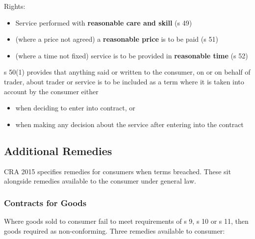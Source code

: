 \documentclass[
]{article}
\providecommand{\tightlist}{%
  \setlength{\itemsep}{0pt}\setlength{\parskip}{0pt}}
\begin{document}
Rights:

\begin{itemize}
\tightlist
\item
  Service performed with \textbf{reasonable care and skill} (s 49)
\item
  (where a price not agreed) a \textbf{reasonable price} is to be paid
  (s 51)
\item
  (where a time not fixed) service is to be provided in
  \textbf{reasonable time} (s 52)
\end{itemize}

s 50(1) provides that anything said or written to the consumer, on or on
behalf of trader, about trader or service is to be included as a term
where it is taken into account by the consumer either

\begin{itemize}
\tightlist
\item
  when deciding to enter into contract, or
\item
  when making any decision about the service after entering into the
  contract
\end{itemize}

\hypertarget{additional-remedies}{%
\subsection{Additional Remedies}\label{additional-remedies}}

CRA 2015 specifies remedies for consumers when terms breached. These sit
alongside remedies available to the consumer under general law.

\hypertarget{contracts-for-goods-1}{%
\subsubsection{Contracts for Goods}\label{contracts-for-goods-1}}

Where goods sold to consumer fail to meet requirements of s 9, s 10 or s
11, then goods required as non-conforming. Three remedies available to
consumer:
\end{document}
